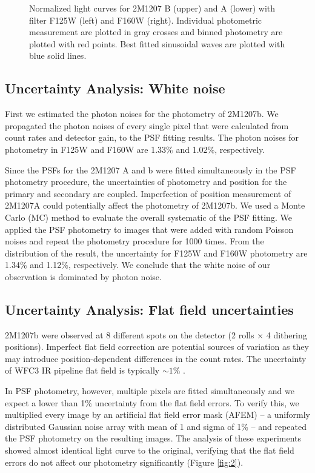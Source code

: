 \documentclass[apj]{emulateapj}
\begin{document}
  \begin{figure}
  \centering
  \caption{Normalized light curves for 2M1207 B (upper) and A (lower)
    with filter F125W (left) and F160W (right). Individual photometric
  measurement are plotted in gray crosses and binned photometry are
  plotted with red points. Best fitted sinusoidal waves are plotted
  with blue solid lines.}
  \label{fig:3}
\end{figure}



\subsection{Uncertainty Analysis: White noise}

First we estimated the photon noises for the photometry of 2M1207b. We
propagated the photon noises of every single pixel that were
calculated from count rates and detector gain, to the PSF fitting
results. The photon noises for photometry in F125W and F160W are
1.33\% and 1.02\%, respectively.

Since the PSFs for the 2M1207 A and b were fitted simultaneously in the
PSF photometry procedure, the uncertainties of photometry and position
for the primary and secondary are coupled. Imperfection of position
measurement of 2M1207A could potentially affect the photometry of
2M1207b. We used a Monte Carlo (MC) method to
evaluate the overall systematic of the PSF fitting. We applied the
PSF photometry to images that were added with random Poisson noises and
repeat the photometry procedure for 1000 times. From the distribution of the
result, the uncertainty for F125W and F160W photometry are 
1.34\% and 1.12\%, respectively. We conclude that the white noise of
our observation is dominated by photon noise.

\subsection{Uncertainty Analysis: Flat field uncertainties}


2M1207b were observed at 8 different spots on the
detector (2 rolls $\times$ 4 dithering positions). Imperfect flat
field correction are potential sources of variation as they may
introduce position-dependent differences in the count rates. The
uncertainty of WFC3 IR pipeline flat field is typically $\sim 1\%$
\citep{dressel2012wide}.

In PSF photometry, however, multiple pixels are fitted simultaneously
and we expect a lower than 1\% uncertainty from the flat field
errors. To verify this, we multiplied every image by an artificial flat
field error mask (AFEM) -- a uniformly distributed Gaussian noise array with
mean of 1 and sigma of 1\% -- and repeated the PSF photometry on the
resulting images.  The analysis of these experiments showed almost
identical light curve to the original, verifying that the flat field
errors do not affect our photometry significantly (Figure
\ref{fig:2}).
\end{document}
